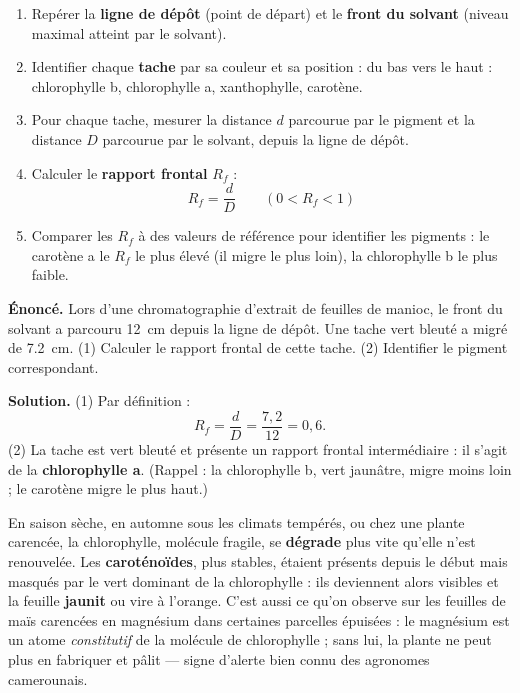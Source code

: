 \documentclass[11pt]{article}
\begin{document}
\begin{methode}
\begin{enumerate}
\item Repérer la \textbf{ligne de dépôt} (point de départ) et le \textbf{front du solvant} (niveau maximal atteint par le solvant).
\item Identifier chaque \textbf{tache} par sa couleur et sa position : du bas vers le haut : chlorophylle b, chlorophylle a, xanthophylle, carotène.
\item Pour chaque tache, mesurer la distance $d$ parcourue par le pigment et la distance $D$ parcourue par le solvant, depuis la ligne de dépôt.
\item Calculer le \textbf{rapport frontal} $R_f$ :
\[ R_f = \frac{d}{D} \qquad (0 < R_f < 1) \]
\item Comparer les $R_f$ à des valeurs de référence pour identifier les pigments : le carotène a le $R_f$ le plus élevé (il migre le plus loin), la chlorophylle b le plus faible.
\end{enumerate}
\end{methode}

\begin{exoresolu}
\textbf{Énoncé.} Lors d'une chromatographie d'extrait de feuilles de manioc, le front du solvant a parcouru \SI{12}{cm} depuis la ligne de dépôt. Une tache vert bleuté a migré de \SI{7,2}{cm}. (1) Calculer le rapport frontal de cette tache. (2) Identifier le pigment correspondant.

\tcblower
\textbf{Solution.}
(1) Par définition :
\[ R_f = \frac{d}{D} = \frac{7{,}2}{12} = 0{,}6. \]
(2) La tache est vert bleuté et présente un rapport frontal intermédiaire : il s'agit de la \textbf{chlorophylle a}. (Rappel : la chlorophylle b, vert jaunâtre, migre moins loin ; le carotène migre le plus haut.)
\end{exoresolu}

\begin{savaistu}
En saison sèche, en automne sous les climats tempérés, ou chez une plante carencée, la chlorophylle, molécule fragile, se \textbf{dégrade} plus vite qu'elle n'est renouvelée. Les \textbf{caroténoïdes}, plus stables, étaient présents depuis le début mais masqués par le vert dominant de la chlorophylle : ils deviennent alors visibles et la feuille \textbf{jaunit} ou vire à l'orange. C'est aussi ce qu'on observe sur les feuilles de maïs carencées en magnésium dans certaines parcelles épuisées : le magnésium est un atome \emph{constitutif} de la molécule de chlorophylle ; sans lui, la plante ne peut plus en fabriquer et pâlit — signe d'alerte bien connu des agronomes camerounais.
\end{savaistu}
\end{document}
